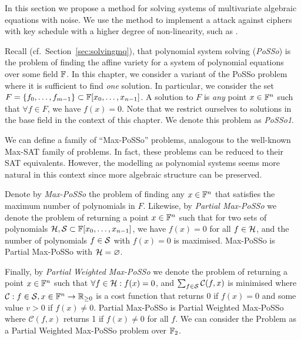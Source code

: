 In this section we propose a method for solving systems of multivariate algebraic equations with noise. We use the method to implement a \coldboot attack against ciphers with key schedule with a higher degree of non-linearity, such as \Serpent.

Recall (cf.\ Section~\ref{sec:solvingmq}), that polynomial system solving (\emph{PoSSo}) is the problem of finding the affine variety for a system of polynomial equations over some field $\mathbb{F}$. In this chapter, we consider a variant of the PoSSo problem where it is sufficient to find \emph{one} solution. In particular, we consider the set $F = \{f_0,\dots,f_{m-1}\} \subset \mathbb{F}[x_0,\dots,x_{n-1}]$. A solution to $F$ is \emph{any} point $x \in \mathbb{F}^n$ such that $\forall f \in F$, we have $f(x) = 0$. Note that we restrict ourselves to solutions in the base field in the context of this chapter. We denote this problem as \emph{PoSSo1}.

We can define a family of ``Max-PoSSo'' problems, analogous to the well-known Max-SAT family of problems. In fact, these problems can be reduced to their SAT equivalents. However, the modelling as polynomial systems seems more natural in this context since more algebraic structure can be preserved.

Denote by \emph{Max-PoSSo} the problem of finding any $x \in \mathbb{F}^n$ that satisfies the maximum number of polynomials in $F$. 
Likewise, by \emph{Partial Max-PoSSo} we denote the problem of returning a point $x \in \mathbb{F}^n$ such that for two sets of polynomials $\mathcal{H}, \mathcal{S} \subset \mathbb{F}[x_0, \dots, x_{n-1}]$, we have $f(x) = 0$ for all $f \in \mathcal{H}$, and the number of polynomials $f \in \mathcal{S}$ with $f(x) = 0$ is maximised. Max-PoSSo is Partial Max-PoSSo with $\mathcal{H} = \varnothing$.

Finally, by \emph{Partial Weighted Max-PoSSo} we denote the problem of returning a point $x \in \mathbb{F}^n$ such that $\forall f \in \mathcal{H}: f(x) = 0$, and $\sum_{f \in \mathcal{S}} \mathcal{C}(f,x)$ is minimised where $\mathcal{C}: f \in \mathcal{S},x \in \mathbb{F}^n \rightarrow \mathbb{R}_{\geq 0}$ is a cost function that returns $0$ if $f(x) = 0$ and some value $v> 0$ if $f(x) \neq 0$. Partial Max-PoSSo is Partial Weighted Max-PoSSo where $\mathcal{C}(f,x)$ returns 1 if $f(x) \neq 0$ for all $f$.
We can consider the \coldboot Problem as a Partial Weighted Max-PoSSo problem over $\mathbb{F}_2$.

